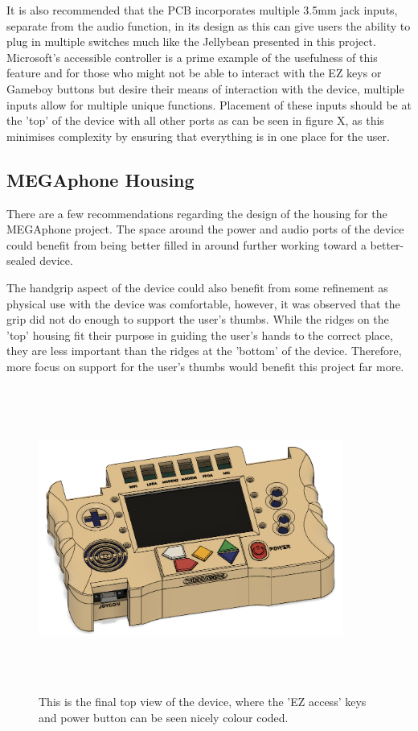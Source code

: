 It is also recommended that the PCB incorporates multiple 3.5mm jack inputs, separate from the audio function, in its design as this can give users the ability to plug in multiple switches much like the Jellybean presented in this project.
Microsoft's accessible controller \cite{adaptive} is a prime example of the usefulness of this feature and for those who might not be able to interact with the EZ keys or Gameboy buttons but desire their means of interaction with the device, multiple inputs allow for multiple unique functions.
Placement of these inputs should be at the 'top' of the device with all other ports as can be seen in figure X, as this minimises complexity by ensuring that everything is in one place for the user.

\subsection{MEGAphone Housing}

There are a few recommendations regarding the design of the housing for the MEGAphone project.
The space around the power and audio ports of the device could benefit from being better filled in around further working toward a better-sealed device.

The handgrip aspect of the device could also benefit from some refinement as physical use with the device was comfortable, however, it was observed that the grip did not do enough to support the user's thumbs.
While the ridges on the 'top' housing fit their purpose in guiding the user's hands to the correct place, they are less important than the ridges at the 'bottom' of the device.
Therefore, more focus on support for the user's thumbs would benefit this project far more.

\begin{figure} [h]
    \centering
    \includegraphics[width=10cm,height=10cm,keepaspectratio]{Figures/final_front_cad.png}
    \caption{This is the final top view of the device, where the 'EZ access' keys and power button can be seen nicely colour coded.}
    \label{fig:FinalTOP}
\end{figure}

